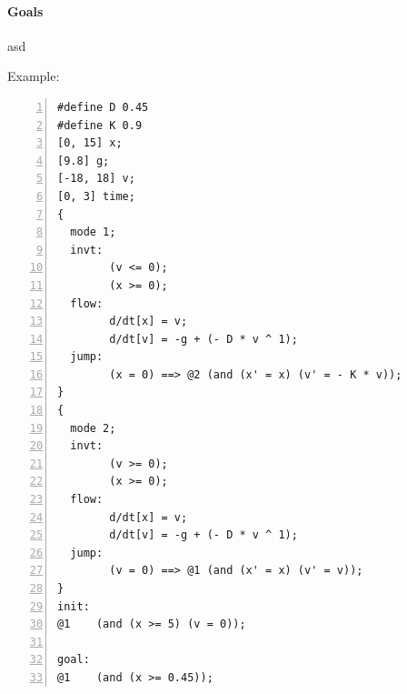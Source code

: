 \paragraph{Goals}
asd



Example:

\begin{Verbatim}[fontfamily=courier, frame=single, framesep=5mm, numbers=left, fontsize=\footnotesize]
#define D 0.45
#define K 0.9
[0, 15] x;
[9.8] g;
[-18, 18] v;
[0, 3] time;
{
  mode 1;
  invt:
        (v <= 0);
        (x >= 0);
  flow:
        d/dt[x] = v;
        d/dt[v] = -g + (- D * v ^ 1);
  jump:
        (x = 0) ==> @2 (and (x' = x) (v' = - K * v));
}
{
  mode 2;
  invt:
        (v >= 0);
        (x >= 0);
  flow:
        d/dt[x] = v;
        d/dt[v] = -g + (- D * v ^ 1);
  jump:
        (v = 0) ==> @1 (and (x' = x) (v' = v));
}
init:
@1    (and (x >= 5) (v = 0));

goal:
@1    (and (x >= 0.45));
\end{Verbatim}


